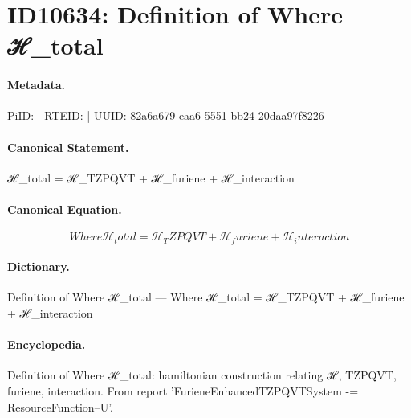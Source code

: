 \section*{ID10634: Definition of Where ℋ\_total}
\paragraph{Metadata.}
PiID:  | RTEID:  | UUID: 82a6a679-eaa6-5551-bb24-20daa97f8226

\paragraph{Canonical Statement.}
ℋ\_total = ℋ\_TZPQVT + ℋ\_furiene + ℋ\_interaction

\paragraph{Canonical Equation.}
\[
Where ℋ_total = ℋ_TZPQVT + ℋ_furiene + ℋ_interaction
\]

\paragraph{Dictionary.}
Definition of Where ℋ\_total — Where ℋ\_total = ℋ\_TZPQVT + ℋ\_furiene + ℋ\_interaction

\paragraph{Encyclopedia.}
Definition of Where ℋ\_total: hamiltonian construction relating ℋ, TZPQVT, furiene, interaction. From report 'FurieneEnhancedTZPQVTSystem -= ResourceFunction--U'.
